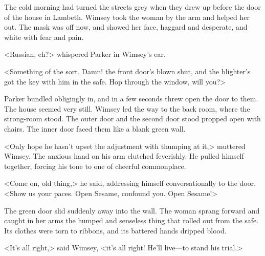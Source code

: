 The cold morning had turned the streets grey when they drew up before the door of the house in Lambeth. Wimsey took the woman by the arm and helped her out. The mask was off now, and showed her face, haggard and desperate, and white with fear and pain.

<Russian, eh?> whispered Parker in Wimsey's ear.

<Something of the sort. Damn! the front door's blown shut, and the blighter's got the key with him in the safe. Hop through the window, will you?>

Parker bundled obligingly in, and in a few seconds threw open the door to them. The house seemed very still. Wimsey led the way to the back room, where the strong-room stood. The outer door and the second door stood propped open with chairs. The inner door faced them like a blank green wall.

<Only hope he hasn't upset the adjustment with thumping at it,> muttered Wimsey. The anxious hand on his arm clutched feverishly. He pulled himself together, forcing his tone to one of cheerful commonplace.

<Come on, old thing,> he said, addressing himself conversationally to the door. <Show us your paces. Open Sesame, confound you. Open Sesame!>

The green door slid suddenly away into the wall. The woman sprang forward and caught in her arms the humped and senseless thing that rolled out from the safe. Its clothes were torn to ribbons, and its battered hands dripped blood.

<It's all right,> said Wimsey, <it's all right! He'll live—to stand his trial.>